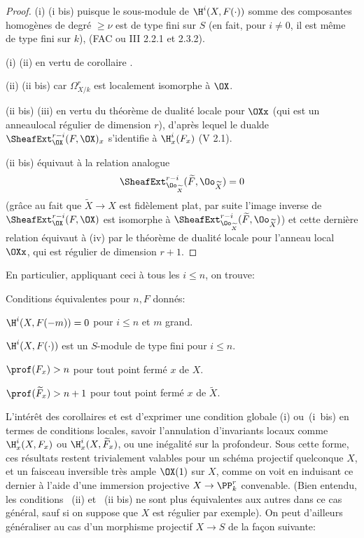 \begin{proof}
(i) \SSI (i bis) puisque le sous-module de $\H^i(X, F(\cdot))$ somme des composantes homog\`enes de degr\'e $\geq \nu$ est de type fini sur $S$ (en fait, pour $i\neq 0$, il est m\^eme de type fini sur $k$), (\cf FAC ou \EGA III 2.2.1 et 2.3.2).

(i) \SSI (ii) en vertu de corollaire .

(ii) \SSI (ii bis) car $\Omega_{X/k}^r$ est localement isomorphe \`a $\OX$.

(ii bis) \SSI (iii) en vertu du th\'eor\`eme de dualit\'e locale pour $\OXx$ (qui est un anneau\pageoriginale local r\'egulier de dimension $r$), d'apr\`es lequel le \og dual\fg de $\SheafExt^{r-i}_{\OX}(F, \OX)_x$ s'identifie \`a $\H^i_x(F_x)$ (V 2.1).

(ii bis) \'equivaut \`a la relation analogue
\[
\SheafExt^{r-i}_{\Oo_{\widetilde{X}}}(\widetilde{F}, \Oo_{\widetilde{X}})=0
\]
(gr\^ace au fait que $\widetilde{X}\to X$ est fid\`element plat, par suite l'image inverse de $\SheafExt^{r-i}_{\OX}(F, \OX)$ est isomorphe \`a $\SheafExt^{r-i}_{\Oo_{\widetilde{X}}}(\widetilde{F}, \Oo_{\widetilde{X}})$) et cette derni\`ere relation \'equivaut \`a (iv) par le th\'eor\`eme de dualit\'e locale pour l'anneau local $\OXx$, qui est r\'egulier de dimension $r+1$.
\skipqed
\end{proof}

En particulier, appliquant ceci \`a tous les $i\leq n$, on trouve:

\begin{corollaire} \label{XII.1.4}
Conditions \'equivalentes pour $n, F$ donn\'es:
\begin{enumeratei}
\item
$\H^i(X, F(-m))=0$ pour $i\leq n$ et $m$ grand.
\item[\textup{(i bis)}] $\H^i(X, F(\cdot))$ est un $S$-module de type fini pour $i\leq n$.
\item
$\prof(F_x)>n$ pour tout point ferm\'e $x$ de $X$.
\item
$\prof(\widetilde{F}_x)>n+1$ pour tout point ferm\'e $x$ de $\widetilde{X}$.
\end{enumeratei}
\end{corollaire}

L'int\'er\^et des corollaires  et  est d'exprimer une condition globale (i) ou~(i~bis) en termes de conditions locales, \ignorespaces savoir l'annulation d'invariants locaux comme $\H_x^i(X, F_x)$ ou $\H_x^i(X, \widetilde{F}_x)$, ou une in\'egalit\'e sur la profondeur. Sous cette forme, ces r\'esultats restent trivialement valables pour un sch\'ema projectif quelconque $X$, et un faisceau inversible tr\`es ample $\OX(1)$ sur $X$, comme on voit en induisant ce dernier \`a l'aide d'une immersion projective $X\to\PP_k^r$ convenable. (Bien entendu, les conditions ~(ii) et ~(ii bis) ne sont plus \'equivalentes aux autres dans ce cas g\'en\'eral, sauf si on suppose que $X$ est r\'egulier par exemple). On peut d'ailleurs g\'en\'eraliser au cas d'un morphisme projectif $X\to S$ de la fa\c con suivante:

